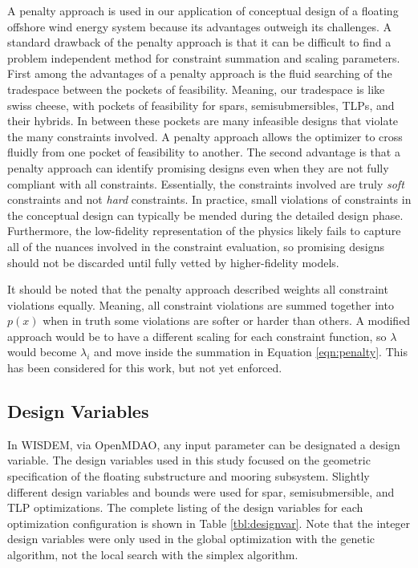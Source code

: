 A penalty approach is used in our application of conceptual design of a
floating offshore wind energy system because its advantages outweigh its
challenges.  A standard drawback of the penalty approach is that it can
be difficult to find a problem independent method for constraint
summation and scaling parameters.  First among the advantages of a
penalty approach is the fluid searching of the tradespace between the
pockets of feasibility.  Meaning, our tradespace is like swiss cheese,
with pockets of feasibility for spars, semisubmersibles, TLPs, and their
hybrids.  In between these pockets are many infeasible designs that
violate the many constraints involved.  A penalty approach allows the
optimizer to cross fluidly from one pocket of feasibility to another.
The second advantage is that a penalty approach can identify promising
designs even when they are not fully compliant with all constraints.
Essentially, the constraints involved are truly \textit{soft}
constraints and not \textit{hard} constraints.  In practice, small
violations of constraints in the conceptual design can typically be
mended during the detailed design phase.  Furthermore, the low-fidelity
representation of the physics likely fails to capture all of the nuances
involved in the constraint evaluation, so promising designs should not
be discarded until fully vetted by higher-fidelity models.

It should be noted that the penalty approach described weights all
constraint violations equally.  Meaning, all constraint violations are
summed together into $p(x)$ when in truth some violations are softer or
harder than others.  A modified approach would be to have a different
scaling for each constraint function, so $\lambda$ would become
$\lambda_i$ and move inside the summation in Equation \ref{eqn:penalty}.
This has been considered for this work, but not yet enforced.

\subsection{Design Variables}
In WISDEM, via OpenMDAO, any input parameter can be designated a design
variable.  The design variables used in this study focused on the
geometric specification of the floating substructure and mooring
subsystem.  Slightly different design variables and bounds were used for
spar, semisubmersible, and TLP optimizations.  The complete listing of
the design variables for each optimization configuration is shown in
Table \ref{tbl:designvar}.  Note that the integer design variables were
only used in the global optimization with the genetic algorithm, not the
local search with the simplex algorithm.

